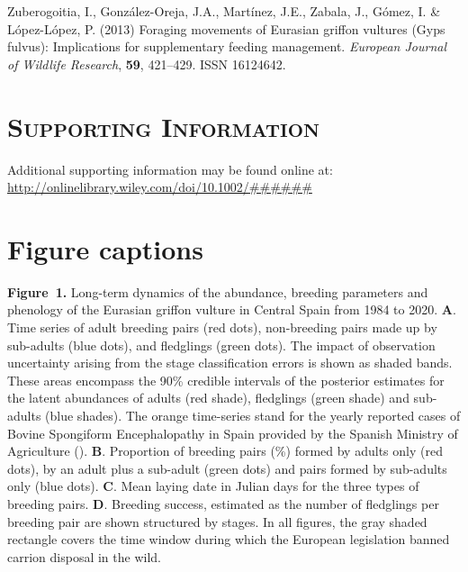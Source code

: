 \documentclass[12pt]{article}
\begin{document}
\begin{thebibliography}{87}
	Zuberogoitia, I., Gonz{\'{a}}lez-Oreja, J.A., Mart{\'{i}}nez, J.E., Zabala, J.,
	G{\'{o}}mez, I. \& L{\'{o}}pez-L{\'{o}}pez, P. (2013) {Foraging movements of
		Eurasian griffon vultures (Gyps fulvus): Implications for supplementary
		feeding management}.
	\newblock \emph{European Journal of Wildlife Research}, \textbf{59}, 421--429.
	\newblock ISSN 16124642.
	
\end{thebibliography}

\section*{\textsc{Supporting Information}}
Additional supporting information may be found online at:  \url{http://onlinelibrary.wiley.com/doi/10.1002/######}

\newpage

\section*{Figure captions}
\noindent \textbf{Figure~1.} Long-term dynamics of the abundance, breeding parameters and phenology of the Eurasian griffon vulture in Central Spain from 1984 to 2020. \textbf{A}. Time series of adult breeding pairs (red dots), non-breeding pairs made up by sub-adults (blue dots), and fledglings (green dots). The impact of observation uncertainty arising from the stage classification errors is shown as shaded bands. These areas encompass the 90\% credible intervals of the posterior estimates for the latent abundances of adults (red shade), fledglings (green shade) and sub-adults (blue shades). The orange time-series stand for the yearly reported cases of Bovine Spongiform Encephalopathy in Spain provided by the Spanish Ministry of Agriculture (\cite{MAPAMA2018}). \textbf{B}. Proportion of breeding pairs (\%) formed by adults only (red dots), by an adult plus a sub-adult (green dots) and pairs formed by sub-adults only (blue dots). \textbf{C}. Mean laying date in Julian days for the three types of breeding pairs. \textbf{D}. Breeding success, estimated as the number of fledglings per breeding pair are shown structured by stages. In all figures, the gray shaded rectangle covers the time window during which the European legislation banned carrion disposal in the wild.  \\
\end{document}
